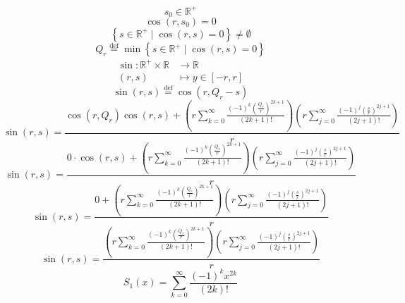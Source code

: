 \documentclass[a4paper,12pt]{report}
\begin{document}
\begin{equation}
s_0 \in \mathbb{R}^+
\end{equation}
\begin{equation}
\cos(r,s_0) = 0
\end{equation}
\begin{equation}
\left\{s \in \mathbb{R}^+ \mid \cos(r,s) = 0\right\} \neq \emptyset
\end{equation}
\begin{equation}
Q_r \stackrel{\text{def}}{=} \min \left\{s \in \mathbb{R}^+ \mid \cos(r,s) = 0\right\}
\end{equation}
\begin{equation}
\begin{aligned}
\sin \colon \mathbb{R}^{+} \times \mathbb{R} & \to \mathbb{R} \\
(r,s) & \mapsto y \in [-r,r]
\end{aligned}
\end{equation}
\begin{equation}
\sin(r,s) \stackrel{\text{def}}{=} \cos(r,Q_r - s)
\end{equation}
\begin{equation}
\sin(r,s) = \frac{\cos(r,Q_r) \cos(r,s) + \left(r \sum \limits_{k=0}^{\infty} \frac{(-1)^k \left(\frac{Q_r}{r}\right)^{2k+1}}{(2k+1)!}\right) \left(r \sum \limits_{j=0}^{\infty} \frac{(-1)^j \left(\frac{s}{r}\right)^{2j+1}}{(2j+1)!}\right)}{r}
\end{equation}
\begin{equation}
\sin(r,s) = \frac{0 \cdot \cos(r,s) + \left(r \sum \limits_{k=0}^{\infty} \frac{(-1)^k \left(\frac{Q_r}{r}\right)^{2k+1}}{(2k+1)!}\right) \left(r \sum \limits_{j=0}^{\infty} \frac{(-1)^j \left(\frac{s}{r}\right)^{2j+1}}{(2j+1)!}\right)}{r}
\end{equation}
\begin{equation}
\sin(r,s) = \frac{0 + \left(r \sum \limits_{k=0}^{\infty} \frac{(-1)^k \left(\frac{Q_r}{r}\right)^{2k+1}}{(2k+1)!}\right) \left(r \sum \limits_{j=0}^{\infty} \frac{(-1)^j \left(\frac{s}{r}\right)^{2j+1}}{(2j+1)!}\right)}{r}
\end{equation}
\begin{equation}
\sin(r,s) = \frac{\left(r \sum \limits_{k=0}^{\infty} \frac{(-1)^k \left(\frac{Q_r}{r}\right)^{2k+1}}{(2k+1)!}\right) \left(r \sum \limits_{j=0}^{\infty} \frac{(-1)^j \left(\frac{s}{r}\right)^{2j+1}}{(2j+1)!}\right)}{r}
\end{equation}
\begin{equation}
S_1(x) = \sum \limits_{k=0}^{\infty} \frac{(-1)^k x^{2k}}{(2k)!}
\end{equation}
\end{document}
